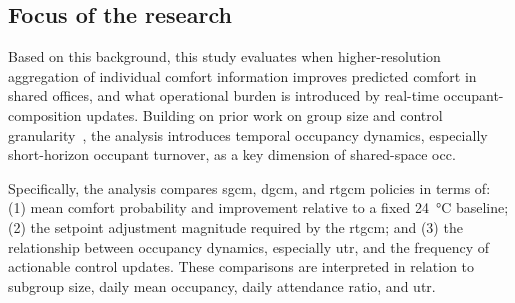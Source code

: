 \subsection{Focus of the research}
\label{subsec:Focus}
Based on this background, this study evaluates when higher-resolution aggregation of individual comfort information improves predicted comfort in shared offices, and what operational burden is introduced by real-time occupant-composition updates.
Building on prior work on group size and control granularity~\cite{ono_effects_2022}\cite{jung_energy_2020}, the analysis introduces temporal occupancy dynamics, especially short-horizon occupant turnover, as a key dimension of shared-space \ac{occ}.

Specifically, the analysis compares \ac{sgcm}, \ac{dgcm}, and \ac{rtgcm} policies in terms of:
(1) mean comfort probability and improvement relative to a fixed \qty{24}{\celsius} baseline;
(2) the setpoint adjustment magnitude required by the \ac{rtgcm}; and
(3) the relationship between occupancy dynamics, especially \ac{utr}, and the frequency of actionable control updates.
These comparisons are interpreted in relation to subgroup size, daily mean occupancy, daily attendance ratio, and \ac{utr}. 



